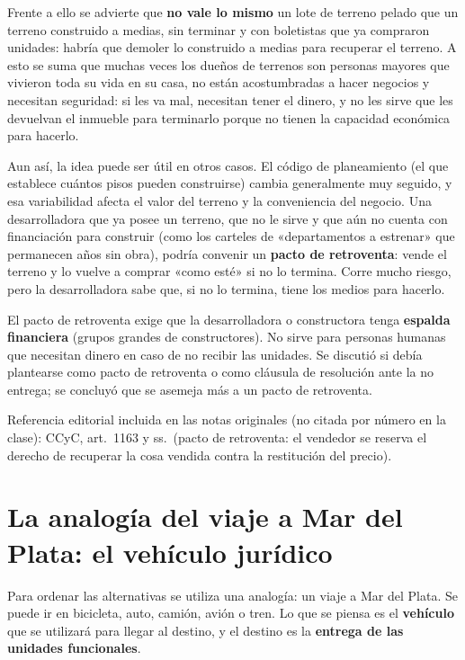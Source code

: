 \documentclass[12pt,oneside]{book}
\begin{document}
Frente a ello se advierte que \textbf{no vale lo mismo} un lote de terreno pelado que un terreno construido a medias, sin terminar y con boletistas que ya compraron unidades: habría que demoler lo construido a medias para recuperar el terreno. A esto se suma que muchas veces los dueños de terrenos son personas mayores que vivieron toda su vida en su casa, no están acostumbradas a hacer negocios y necesitan seguridad: si les va mal, necesitan tener el dinero, y no les sirve que les devuelvan el inmueble para terminarlo porque no tienen la capacidad económica para hacerlo.

Aun así, la idea puede ser útil en otros casos. El código de planeamiento (el que establece cuántos pisos pueden construirse) cambia generalmente muy seguido, y esa variabilidad afecta el valor del terreno y la conveniencia del negocio. Una desarrolladora que ya posee un terreno, que no le sirve y que aún no cuenta con financiación para construir (como los carteles de «departamentos a estrenar» que permanecen años sin obra), podría convenir un \textbf{pacto de retroventa}: vende el terreno y lo vuelve a comprar «como esté» si no lo termina. Corre mucho riesgo, pero la desarrolladora sabe que, si no lo termina, tiene los medios para hacerlo.

\begin{important}
El pacto de retroventa exige que la desarrolladora o constructora tenga \textbf{espalda financiera} (grupos grandes de constructores). No sirve para personas humanas que necesitan dinero en caso de no recibir las unidades. Se discutió si debía plantearse como pacto de retroventa o como cláusula de resolución ante la no entrega; se concluyó que se asemeja más a un pacto de retroventa.
\end{important}

\begin{note}
Referencia editorial incluida en las notas originales (no citada por número en la clase): CCyC, art.~1163 y ss.\ (pacto de retroventa: el vendedor se reserva el derecho de recuperar la cosa vendida contra la restitución del precio).
\end{note}

\section{La analogía del viaje a Mar del Plata: el vehículo jurídico}

Para ordenar las alternativas se utiliza una analogía: un viaje a Mar del Plata. Se puede ir en bicicleta, auto, camión, avión o tren. Lo que se piensa es el \textbf{vehículo} que se utilizará para llegar al destino, y el destino es la \textbf{entrega de las unidades funcionales}.
\end{document}
